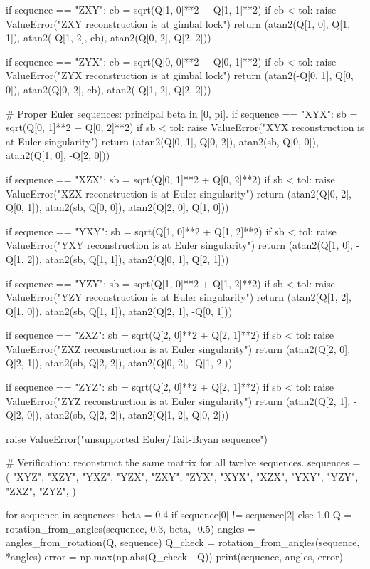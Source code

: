 \begin{python}
    if sequence == "ZXY":
        cb = sqrt(Q[1, 0]**2 + Q[1, 1]**2)
        if cb < tol:
            raise ValueError("ZXY reconstruction is at gimbal lock")
        return (atan2(Q[1, 0], Q[1, 1]),
                atan2(-Q[1, 2], cb),
                atan2(Q[0, 2], Q[2, 2]))

    if sequence == "ZYX":
        cb = sqrt(Q[0, 0]**2 + Q[0, 1]**2)
        if cb < tol:
            raise ValueError("ZYX reconstruction is at gimbal lock")
        return (atan2(-Q[0, 1], Q[0, 0]),
                atan2(Q[0, 2], cb),
                atan2(-Q[1, 2], Q[2, 2]))

    # Proper Euler sequences: principal beta in [0, pi].
    if sequence == "XYX":
        sb = sqrt(Q[0, 1]**2 + Q[0, 2]**2)
        if sb < tol:
            raise ValueError("XYX reconstruction is at Euler singularity")
        return (atan2(Q[0, 1], Q[0, 2]),
                atan2(sb, Q[0, 0]),
                atan2(Q[1, 0], -Q[2, 0]))

    if sequence == "XZX":
        sb = sqrt(Q[0, 1]**2 + Q[0, 2]**2)
        if sb < tol:
            raise ValueError("XZX reconstruction is at Euler singularity")
        return (atan2(Q[0, 2], -Q[0, 1]),
                atan2(sb, Q[0, 0]),
                atan2(Q[2, 0], Q[1, 0]))

    if sequence == "YXY":
        sb = sqrt(Q[1, 0]**2 + Q[1, 2]**2)
        if sb < tol:
            raise ValueError("YXY reconstruction is at Euler singularity")
        return (atan2(Q[1, 0], -Q[1, 2]),
                atan2(sb, Q[1, 1]),
                atan2(Q[0, 1], Q[2, 1]))

    if sequence == "YZY":
        sb = sqrt(Q[1, 0]**2 + Q[1, 2]**2)
        if sb < tol:
            raise ValueError("YZY reconstruction is at Euler singularity")
        return (atan2(Q[1, 2], Q[1, 0]),
                atan2(sb, Q[1, 1]),
                atan2(Q[2, 1], -Q[0, 1]))

    if sequence == "ZXZ":
        sb = sqrt(Q[2, 0]**2 + Q[2, 1]**2)
        if sb < tol:
            raise ValueError("ZXZ reconstruction is at Euler singularity")
        return (atan2(Q[2, 0], Q[2, 1]),
                atan2(sb, Q[2, 2]),
                atan2(Q[0, 2], -Q[1, 2]))

    if sequence == "ZYZ":
        sb = sqrt(Q[2, 0]**2 + Q[2, 1]**2)
        if sb < tol:
            raise ValueError("ZYZ reconstruction is at Euler singularity")
        return (atan2(Q[2, 1], -Q[2, 0]),
                atan2(sb, Q[2, 2]),
                atan2(Q[1, 2], Q[0, 2]))

    raise ValueError("unsupported Euler/Tait-Bryan sequence")


# Verification: reconstruct the same matrix for all twelve sequences.
sequences = (
    "XYZ", "XZY", "YXZ", "YZX", "ZXY", "ZYX",
    "XYX", "XZX", "YXY", "YZY", "ZXZ", "ZYZ",
)

for sequence in sequences:
    beta = 0.4 if sequence[0] != sequence[2] else 1.0
    Q = rotation_from_angles(sequence, 0.3, beta, -0.5)
    angles = angles_from_rotation(Q, sequence)
    Q_check = rotation_from_angles(sequence, *angles)
    error = np.max(np.abs(Q_check - Q))
    print(sequence, angles, error)
\end{python}

